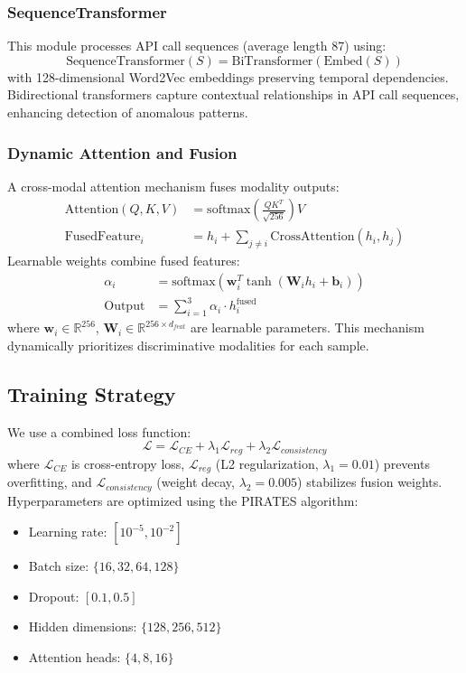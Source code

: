 \documentclass[10pt,conference]{IEEEtran}
\begin{document}
\subsubsection{SequenceTransformer}
This module processes API call sequences (average length 87) using:
\begin{equation}
\text{SequenceTransformer}(S) = \text{BiTransformer}(\text{Embed}(S))
\end{equation}
with 128-dimensional Word2Vec embeddings preserving temporal dependencies. Bidirectional transformers capture contextual relationships in API call sequences, enhancing detection of anomalous patterns.

\subsubsection{Dynamic Attention and Fusion}
A cross-modal attention mechanism fuses modality outputs:
\begin{align}
\text{Attention}(Q, K, V) &= \text{softmax}\left(\frac{QK^T}{\sqrt{256}}\right)V \\
\text{FusedFeature}_i &= h_i + \sum_{j \neq i} \text{CrossAttention}(h_i, h_j)
\end{align}
Learnable weights combine fused features:
\begin{align}
\alpha_i &= \text{softmax}(\mathbf{w}_i^T \tanh(\mathbf{W}_i h_i + \mathbf{b}_i)) \\
\text{Output} &= \sum_{i=1}^{3} \alpha_i \cdot h_i^{\text{fused}}
\end{align}
where $\mathbf{w}_i \in \mathbb{R}^{256}$, $\mathbf{W}_i \in \mathbb{R}^{256 \times d_{feat}}$ are learnable parameters. This mechanism dynamically prioritizes discriminative modalities for each sample.

\subsection{Training Strategy}
We use a combined loss function:
\begin{equation}
\mathcal{L} = \mathcal{L}_{CE} + \lambda_1 \mathcal{L}_{reg} + \lambda_2 \mathcal{L}_{consistency}
\end{equation}
where $\mathcal{L}_{CE}$ is cross-entropy loss, $\mathcal{L}_{reg}$ (L2 regularization, $\lambda_1 = 0.01$) prevents overfitting, and $\mathcal{L}_{consistency}$ (weight decay, $\lambda_2 = 0.005$) stabilizes fusion weights. Hyperparameters are optimized using the PIRATES algorithm:
\begin{itemize}
    \item Learning rate: $[10^{-5}, 10^{-2}]$
    \item Batch size: $\{16, 32, 64, 128\}$
    \item Dropout: $[0.1, 0.5]$
    \item Hidden dimensions: $\{128, 256, 512\}$
    \item Attention heads: $\{4, 8, 16\}$
\end{itemize}
\end{document}
